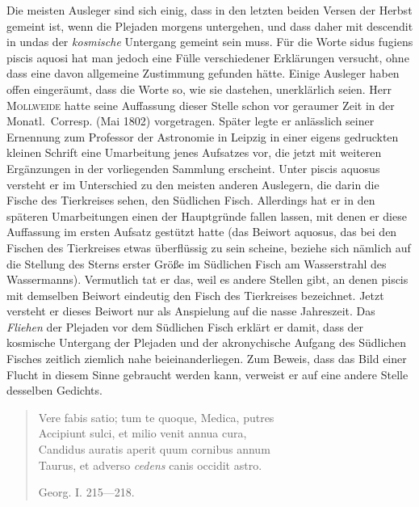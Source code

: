 Die meisten Ausleger sind sich einig, dass in den letzten beiden Versen der Herbst gemeint ist, wenn die Plejaden morgens untergehen, und dass daher mit descendit in undas der \emph{kosmische} Untergang gemeint sein muss. Für die Worte sidus fugiens piscis aquosi hat man jedoch eine Fülle verschiedener Erklärungen versucht, ohne dass eine davon allgemeine Zustimmung gefunden hätte. Einige Ausleger haben offen eingeräumt, dass die Worte so, wie sie dastehen, unerklärlich seien. Herr \textsc{Mollweide} hatte seine Auffassung dieser Stelle schon vor geraumer Zeit in der Monatl.\ Corresp. (Mai 1802) vorgetragen. Später legte er anlässlich seiner Ernennung zum Professor der Astronomie in Leipzig in einer eigens gedruckten kleinen Schrift eine Umarbeitung jenes Aufsatzes vor, die jetzt mit weiteren Ergänzungen in der vorliegenden Sammlung erscheint. Unter piscis aquosus versteht er im Unterschied zu den meisten anderen Auslegern, die darin die Fische des Tierkreises sehen, den Südlichen Fisch. Allerdings hat er in den späteren Umarbeitungen einen der Hauptgründe fallen lassen, mit denen er diese Auffassung im ersten Aufsatz gestützt hatte (das Beiwort aquosus, das bei den Fischen des Tierkreises etwas überflüssig zu sein scheine, beziehe sich nämlich auf die Stellung des Sterns erster Größe im Südlichen Fisch am Wasserstrahl des Wassermanns). Vermutlich tat er das, weil es andere Stellen gibt, an denen piscis mit demselben Beiwort eindeutig den Fisch des Tierkreises bezeichnet. Jetzt versteht er dieses Beiwort nur als Anspielung auf die nasse Jahreszeit. Das \emph{Fliehen} der Plejaden vor dem Südlichen Fisch erklärt er damit, dass der kosmische Untergang der Plejaden und der akronychische Aufgang des Südlichen Fisches zeitlich ziemlich nahe beieinanderliegen. Zum Beweis, dass das Bild einer Flucht in diesem Sinne gebraucht werden kann, verweist er auf eine andere Stelle desselben Gedichts.

\enlargethispage{-10\baselineskip}
\begin{quote}\small Vere fabis satio; tum te quoque, Medica, putres \\ Accipiunt sulci, et milio venit annua cura, \\ Candidus auratis aperit quum cornibus annum \\ Taurus, et adverso \emph{cedens} canis occidit astro.

\hfill Georg. I. 215---218. \end{quote}

